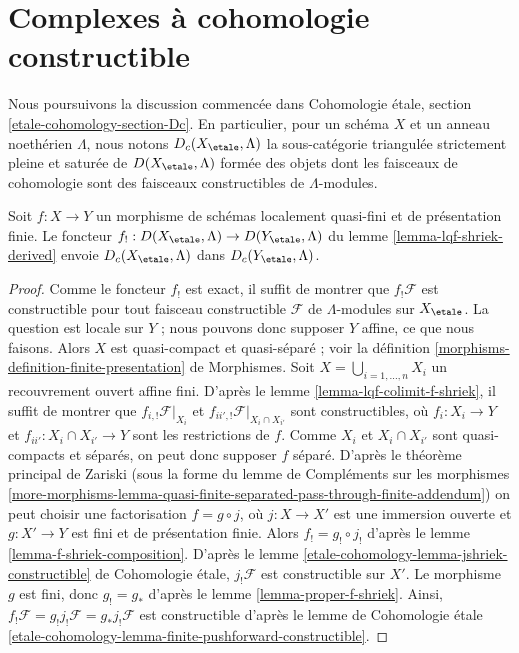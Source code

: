 \section{Complexes à cohomologie constructible}
\label{section-Dc}

\noindent
Nous poursuivons la discussion commencée dans Cohomologie étale, section
\ref{etale-cohomology-section-Dc}. En particulier, pour un schéma
$X$ et un anneau noethérien $\Lambda$, nous notons
$D_c(X_\etale, \Lambda)$ la sous-catégorie triangulée strictement pleine et saturée
de $D(X_\etale, \Lambda)$ formée des objets
dont les faisceaux de cohomologie sont des faisceaux constructibles de $\Lambda$-modules.

\begin{lemma}
\label{lemma-qf-f-shriek-constructible}
Soit $f : X \to Y$ un morphisme de schémas
localement quasi-fini et de présentation finie.
Le foncteur $f_! : D(X_\etale, \Lambda) \to D(Y_\etale, \Lambda)$
du lemme \ref{lemma-lqf-shriek-derived}
envoie $D_c(X_\etale, \Lambda)$ dans $D_c(Y_\etale, \Lambda)$.
\end{lemma}

\begin{proof}
Comme le foncteur $f_!$ est exact, il suffit de montrer que
$f_!\mathcal{F}$ est constructible pour tout faisceau constructible
$\mathcal{F}$ de $\Lambda$-modules sur $X_\etale$.
La question est locale sur $Y$ ; nous pouvons donc supposer
$Y$ affine, ce que nous faisons.
Alors $X$ est quasi-compact et quasi-séparé ; voir la
définition \ref{morphisms-definition-finite-presentation} de Morphismes.
Soit $X = \bigcup_{i = 1, \ldots, n} X_i$ un recouvrement ouvert affine
fini. D'après le lemme \ref{lemma-lqf-colimit-f-shriek},
il suffit de montrer que
$f_{i, !}\mathcal{F}|_{X_i}$ et $f_{ii', !}\mathcal{F}|_{X_i \cap X_{i'}}$
sont constructibles, où $f_i : X_i \to Y$ et
$f_{ii'} : X_i \cap X_{i'} \to Y$ sont les restrictions de $f$.
Comme $X_i$ et $X_i \cap X_{i'}$ sont quasi-compacts et séparés,
on peut donc supposer $f$ séparé.
D'après le théorème principal de Zariski (sous la forme du
lemme de Compléments sur les morphismes
\ref{more-morphisms-lemma-quasi-finite-separated-pass-through-finite-addendum})
on peut choisir une factorisation $f = g \circ j$, où
$j : X \to X'$ est une immersion ouverte et $g : X' \to Y$ est
fini et de présentation finie. Alors $f_! = g_! \circ j_!$ d'après le
lemme \ref{lemma-f-shriek-composition}.
D'après le lemme \ref{etale-cohomology-lemma-jshriek-constructible} de Cohomologie étale,
$j_!\mathcal{F}$ est constructible sur $X'$.
Le morphisme $g$ est fini, donc $g_! = g_*$
d'après le lemme \ref{lemma-proper-f-shriek}.
Ainsi, $f_!\mathcal{F} = g_!j_!\mathcal{F} = g_*j_!\mathcal{F}$
est constructible d'après le
lemme de Cohomologie étale
\ref{etale-cohomology-lemma-finite-pushforward-constructible}.
\end{proof}

